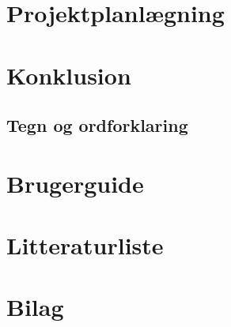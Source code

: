 \documentclass[12pt,oneside,a4paper,english]{article}
\begin{document}
\newpage
\section{Projektplanlægning}
\thispagestyle{fancy}

\newpage
\section{Konklusion}
\thispagestyle{fancy}

\newpage
\begin{flushleft}
\section{Tegn og ordforklaring}
\end{flushleft}

\thispagestyle{fancy}

\newpage
\section{Brugerguide}
\thispagestyle{fancy}

\newpage
\section{Litteraturliste}

\newpage
\section{Bilag}
\label{endOfDoc}
\end{document}
